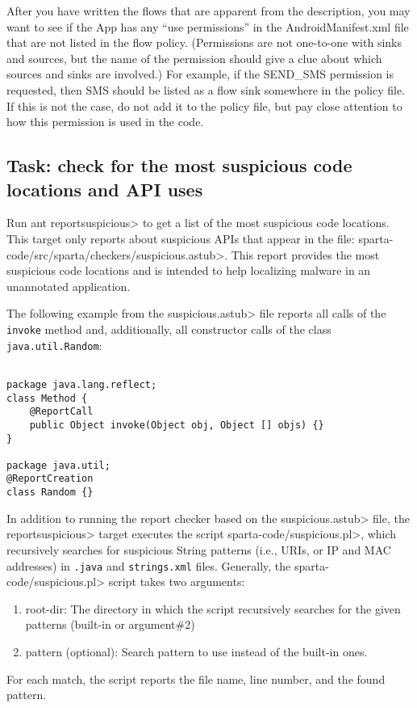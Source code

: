  After you have written the flows that are apparent from the description, you may want to see if the App
  has any ``use permissions'' in the AndroidManifest.xml file that are not listed in the flow policy. 
  (Permissions are not one-to-one with sinks and sources, but the name of the permission should give 
  a clue about which sources and sinks are involved.)  For example, if the SEND\_SMS permission is 
  requested, then SMS should be listed as a flow sink somewhere in the policy file.  If this is not the 
  case, do not add it to the policy file, but pay close attention to how this permission is used in the 
  code.

\subsection{Task: check for the most suspicious code locations and API uses}
\label{sec:appanalysis/suspicious}
Run \<ant reportsuspicious> to get a list of the most suspicious code
locations. 
This target only reports about suspicious APIs that appear 
in the file:
\<sparta-code/src/sparta/checkers/suspicious.astub>. This report
provides the most suspicious code locations and is intended to help
localizing malware in an unannotated application.

The following example from the \<suspicious.astub> file reports all calls
of the \verb|invoke| method and, additionally, all constructor calls 
of the class \verb|java.util.Random|:

\begin{Verbatim}

package java.lang.reflect;                                             
class Method {                                                         
    @ReportCall                                                        
    public Object invoke(Object obj, Object [] objs) {}                
}                                                                      
                                                                       
package java.util;                                                     
@ReportCreation                                                        
class Random {}

\end{Verbatim}

In addition to running the report checker based on the 
\<suspicious.astub> file, the \<reportsuspicious> target executes
the script \<sparta-code/suspicious.pl>, which recursively searches for 
suspicious String patterns (i.e., URIs, or IP and MAC addresses) 
in \verb|.java| and \verb|strings.xml| files.
Generally, the \<sparta-code/suspicious.pl> script takes two arguments:
\begin{enumerate}
 \item root-dir: The directory in which the script recursively 
       searches for the given patterns (built-in or argument\#2)
 \item pattern (optional): Search pattern to use instead of the
built-in ones. 
\end{enumerate}
For each match, the script reports the file name, line
number, and the found pattern.

